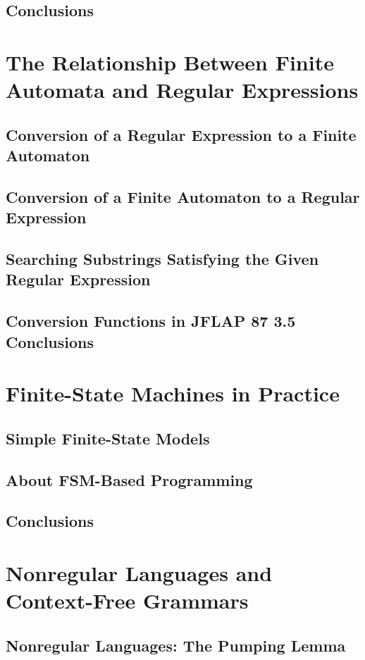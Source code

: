 \documentclass[a4paper]{article}
\begin{document}
\subsection{Conclusions}

\newpage
\section{The Relationship Between Finite Automata and Regular Expressions}
\subsection{Conversion of a Regular Expression to a Finite Automaton}
\subsection{Conversion of a Finite Automaton to a Regular Expression}
\subsection{Searching Substrings Satisfying the Given Regular Expression}
\subsection{Conversion Functions in JFLAP 87 3.5 Conclusions}

\newpage
\section{Finite-State Machines in Practice}
\subsection{Simple Finite-State Models}
\subsection{About FSM-Based Programming}
\subsection{Conclusions}

\newpage
\section{Nonregular Languages and Context-Free Grammars}
\subsection{Nonregular Languages: The Pumping Lemma}
\end{document}
